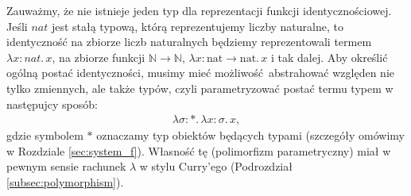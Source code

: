 
\begin{przyklad}\label{ex:church_identity}
Zauważmy, że nie istnieje jeden typ dla reprezentacji funkcji identycznościowej. Jeśli \(nat\) jest stałą typową, którą reprezentujemy liczby naturalne, to identyczność na zbiorze liczb naturalnych będziemy reprezentowali termem \(\lambda x:nat.\,x\), na zbiorze funkcji \(\mathbb{N}\to\mathbb{N}\), \(\lambda x:\mathrm{nat}\to\mathrm{nat}.\,x\) i tak dalej.
  Aby określić ogólną postać identyczności, musimy mieć możliwość abstrahować względen nie tylko zmiennych, ale także typów, czyli parametryzować postać termu typem w następujcy sposób: %
      \begin{align*}
        \lambda \sigma:* .\,\lambda x:\sigma.\,x,
      \end{align*}
      gdzie symbolem \(*\) oznaczamy typ obiektów będących typami (szczegóły omówimy w Rozdziale \ref{sec:system_f}).
      Własność tę (polimorfizm parametryczny) miał w pewnym sensie rachunek \(\lambda\) w stylu Curry'ego (Podrozdział \ref{subsec:polymorphism}). 
\end{przyklad}

